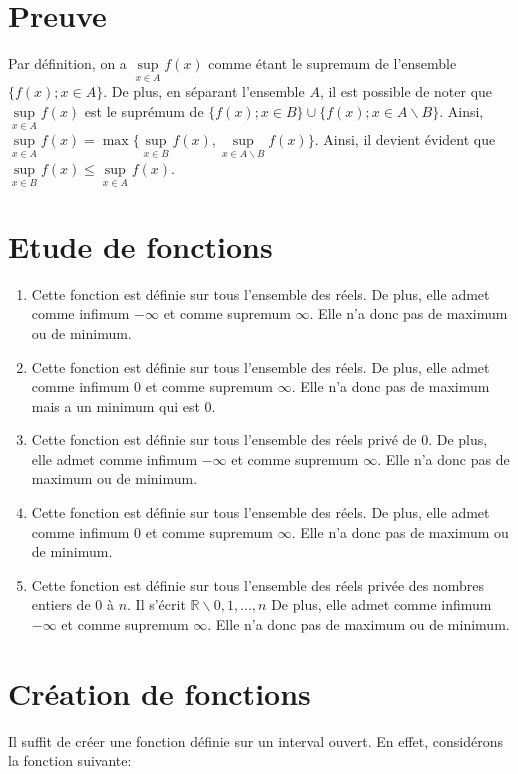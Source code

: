 \documentclass[a4paper, 12pt, french, twoside]{article}
\newcommand{\Rr}{{\mathbb{R}}}
\begin{document}
\section{Preuve}
Par définition, on a  $\underset{x\in A}{\sup}f(x)$ comme étant le supremum de l'ensemble $\{f(x) ; x\in A\}$. De plus, en séparant l'ensemble $A$, il est possible de noter que $\underset{x\in A}{\sup}f(x)$ est le suprémum de $\{f(x) ; x\in B\} \cup \{f(x) ; x\in A\backslash B\}$. Ainsi, $\underset{x\in A}{\sup}f(x) = \max \{\underset{x\in B}{\sup}f(x), \underset{x\in A \backslash B}{\sup}f(x) \}$. Ainsi, il devient évident que $\underset{x\in B}{\sup}f(x) \leq \underset{x\in A}{\sup}f(x)$.

\section{Etude de fonctions}
\begin{enumerate}
    \item Cette fonction est définie sur tous l'ensemble des réels. De plus, elle admet comme infimum $-\infty$ et comme supremum $\infty$. Elle n'a donc pas de maximum ou de minimum.
    \item Cette fonction est définie sur tous l'ensemble des réels. De plus, elle admet comme infimum $0$ et comme supremum $\infty$. Elle n'a donc pas de maximum mais a un minimum qui est 0.
    \item Cette fonction est définie sur tous l'ensemble des réels privé de 0. De plus, elle admet comme infimum $-\infty$ et comme supremum $\infty$. Elle n'a donc pas de maximum ou de minimum.
    \item Cette fonction est définie sur tous l'ensemble des réels. De plus, elle admet comme infimum $0$ et comme supremum $\infty$. Elle n'a donc pas de maximum ou de minimum.
    \item Cette fonction est définie sur tous l'ensemble des réels privée des nombres entiers de 0 à $n$. Il s'écrit $\Rr \backslash {0, 1,...,n}$ De plus, elle admet comme infimum $-\infty$ et comme supremum $\infty$. Elle n'a donc pas de maximum ou de minimum.
\end{enumerate}

\section{Création de fonctions}
Il suffit de créer une fonction définie sur un interval ouvert. En effet, considérons la fonction suivante:
\end{document}
